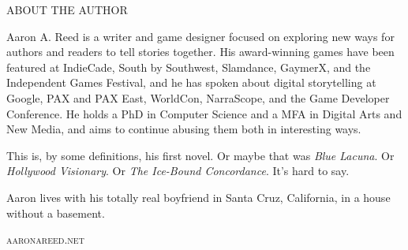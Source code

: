 
\cleartorecto

\thispagestyle{empty}
\begin{parascale}[0.88]

\vspace*{9\nbs}

\begin{adjustwidth}{4em}{4em}
\begin{center}
\textsc{ABOUT THE AUTHOR}
\end{center}
\vspace*{2\nbs}

Aaron A. Reed is a writer and game designer focused on exploring new ways for authors and readers to tell stories together. His award-winning games have been featured at IndieCade, South by Southwest, Slamdance, GaymerX, and the Independent Games Festival, and he has spoken about digital storytelling at Google, PAX and PAX East, WorldCon, NarraScope, and the Game Developer Conference. He holds a PhD in Computer Science and a MFA in Digital Arts and New Media, and aims to continue abusing them both in interesting ways.

This is, by some definitions, his first novel. Or maybe that was \textit{Blue Lacuna}. Or \textit{Hollywood Visionary}. Or \textit{The Ice-Bound Concordance}. It's hard to say.

Aaron lives with his totally real boyfriend in Santa Cruz, California, in a house without a basement.
\end{adjustwidth}

\vspace*{2\nbs}

\begin{center}
\textsc{aaronareed.net}
\end{center}

\end{parascale}

\clearpage %
